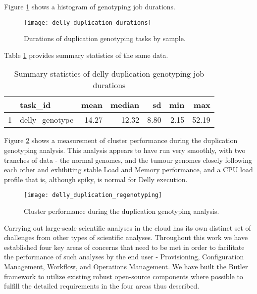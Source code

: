 Figure \ref{fig:delly_duplication_durations} shows a histogram of genotyping job durations.

\begin{figure}[H]
\texttt{[image: delly\_duplication\_durations]}
\centering
\caption {Durations of duplication genotyping tasks by sample.}
\label{fig:delly_duplication_durations}
\end{figure}

Table \ref{tab:delly_duplication_summary_stats} provides summary statistics of the same data.

\begin{table}[H]
\caption {Summary statistics of delly duplication genotyping job durations} \label{tab:delly_duplication_summary_stats}
\centering
\begin{tabular}{rlrrrrr}
  \hline
 & task\_id & mean & median & sd & min & max \\ 
  \hline
1 & delly\_genotype & 14.27 & 12.32 & 8.80 & 2.15 & 52.19 \\ 
   \hline
\end{tabular}
\end{table}

Figure \ref{fig:delly_duplication_regenotyping} shows a measurement of cluster performance during the duplication genotyping analysis. This analysis appears to have run very smoothly, with two tranches of data - the normal genomes, and the tumour genomes closely following each other and exhibiting stable Load and Memory performance, and a CPU load profile that is, although spiky, is normal for Delly execution.

\begin{figure}[H]
\texttt{[image: delly\_duplication\_regenotyping]}
\centering
\caption {Cluster performance during the duplication genotyping analysis.}
\label{fig:delly_duplication_regenotyping}
\end{figure}

Carrying out large-scale scientific analyses in the cloud has its own distinct set of challenges from other types of scientific analyses. Throughout this work we have established four key areas of concerns that need to be met in order to facilitate the performance of such analyses by the end user - Provisioning, Configuration Management, Workflow, and Operations Management. We have built the Butler framework to utilize existing robust open-source components where possible to fulfill the detailed requirements in the four areas thus described.

